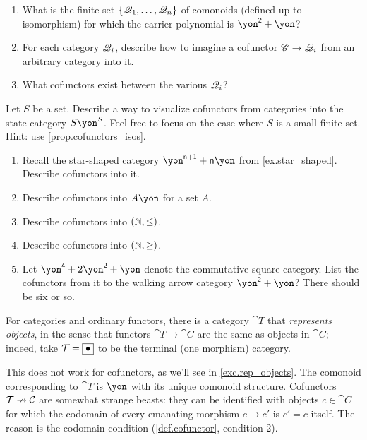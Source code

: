 \documentclass[DynamicalBook]{subfiles}
\begin{document}
\begin{exercise}
\begin{enumerate}
	\item What is the finite set $\{\mathscr{Q}_1,\ldots,\mathscr{Q}_n\}$ of comonoids (defined up to isomorphism) for which the carrier polynomial is $\yon^\2+\yon$?
	\item For each category $\mathscr{Q}_i$, describe how to imagine a cofunctor $\mathscr{C}\to\mathscr{Q}_i$ from an arbitrary category into it.
	\item What cofunctors exist between the various $\mathscr{Q}_i$?
\qedhere
\end{enumerate}
\end{exercise}

\begin{exercise}
Let $S$ be a set. Describe a way to visualize cofunctors from categories into the state category $S\yon^S$. Feel free to focus on the case where $S$ is a small finite set. Hint: use \cref{prop.cofunctors_isos}.
\end{exercise}

\begin{exercise}
\begin{enumerate}
	\item Recall the star-shaped category $\yon^{\ord{n}+\1}+\ord{n}\yon$ from \cref{ex.star_shaped}. Describe cofunctors into it.
	\item Describe cofunctors into $A\yon$ for a set $A$.
	\item Describe cofunctors into $(\mathbb{N},\leq)$.
	\item Describe cofunctors into $(\mathbb{N},\geq)$.
	\item Let $\yon^\4+2\yon^\2+\yon$ denote the commutative square category. List the cofunctors from it to the walking arrow category $\yon^\2+\yon$? There should be six or so.
\qedhere
\end{enumerate}
\end{exercise}

\begin{example}\label{ex.rep_objects}
For categories and ordinary functors, there is a category $\cat{T}$ that \emph{represents objects}, in the sense that functors $\cat{T}\to\cat{C}$ are the same as objects in $\cat{C}$; indeed, take $\mathcal{T}=\fbox{$\bullet$}$ to be the terminal (one morphism) category.

This does not work for cofunctors, as we'll see in \cref{exc.rep_objects}. The comonoid corresponding to $\cat{T}$ is $\yon$ with its unique comonoid structure. Cofunctors $\mathcal{T}\nrightarrow\mathcal{C}$ are somewhat strange beasts: they can be identified with objects $c\in\cat{C}$ for which the codomain of every emanating morphism $c\to c'$ is $c'=c$ itself. The reason is the codomain condition (\cref{def.cofunctor}, condition 2).
\end{example}
\end{document}
